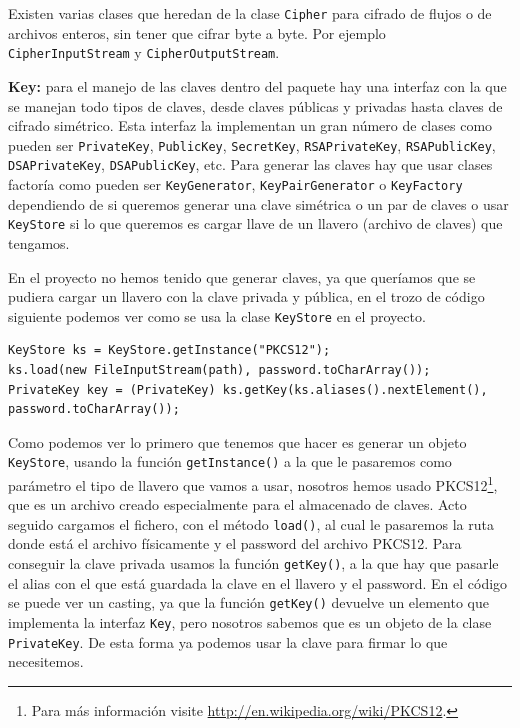 Existen varias clases que heredan de la clase \lstinline{Cipher} para cifrado de flujos o de archivos enteros, sin tener que cifrar byte a byte. Por ejemplo \lstinline{CipherInputStream} y \lstinline{CipherOutputStream}. 

\textbf{Key:} para el manejo de las claves dentro del paquete hay una interfaz con la que se manejan todo tipos de claves, desde claves públicas y privadas hasta claves de cifrado simétrico. Esta interfaz la implementan un gran número de clases como pueden ser \lstinline{PrivateKey}, \lstinline{PublicKey}, \lstinline{SecretKey}, \lstinline{RSAPrivateKey}, \lstinline{RSAPublicKey}, \lstinline{DSAPrivateKey}, \lstinline{DSAPublicKey}, etc. Para generar las claves hay que usar clases factoría como pueden ser \lstinline{KeyGenerator}, \lstinline{KeyPairGenerator} o \lstinline{KeyFactory} dependiendo de si queremos generar una clave simétrica o un par de claves o usar \lstinline{KeyStore} si lo que queremos es cargar llave de un llavero (archivo de claves) que tengamos.

En el proyecto no hemos tenido que generar claves, ya que queríamos que se pudiera cargar un llavero con la clave privada y pública, en el trozo de código siguiente podemos ver como se usa la clase \lstinline{KeyStore} en el proyecto.

\begin{lstlisting}[style=Java] 
KeyStore ks = KeyStore.getInstance("PKCS12");
ks.load(new FileInputStream(path), password.toCharArray());
PrivateKey key = (PrivateKey) ks.getKey(ks.aliases().nextElement(), password.toCharArray());
\end{lstlisting}

Como podemos ver lo primero que tenemos que hacer es generar un objeto \lstinline{KeyStore}, usando la función \lstinline{getInstance()} a la que le pasaremos como parámetro el tipo de llavero que vamos a usar, nosotros hemos usado PKCS12\footnote{ Para más información visite \url{http://en.wikipedia.org/wiki/PKCS12}.}, que es un archivo creado especialmente para el almacenado de claves. Acto seguido cargamos el fichero, con el método \lstinline{load()}, al cual le pasaremos la ruta donde está el archivo físicamente y el password del archivo PKCS12. Para conseguir la clave privada usamos la función \lstinline{getKey()}, a la que hay que pasarle el alias con el que está guardada la clave en el llavero y el password. En el código se puede ver un casting, ya que la función \lstinline{getKey()} devuelve un elemento que implementa la interfaz \lstinline{Key}, pero nosotros sabemos que es un objeto de la clase \lstinline{PrivateKey}. De esta forma ya podemos usar la clave para firmar lo que necesitemos.

